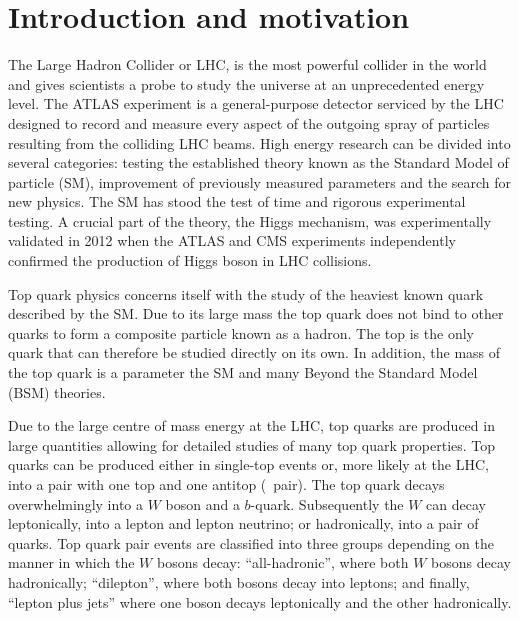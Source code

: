 \chapter{Introduction and motivation}
\label{sec:Introduction}

The Large Hadron Collider or LHC, is the most powerful collider in the world and gives scientists a probe to study the universe at an unprecedented energy level. The ATLAS experiment is a general-purpose detector serviced by the LHC designed to record and measure every aspect of the outgoing spray of particles resulting from the colliding LHC beams. High energy research can be divided into several categories: testing the established theory known as the Standard Model of particle (SM), improvement of previously measured parameters and the search for new physics. The SM has stood the test of time and rigorous experimental testing. A crucial part of the theory, the Higgs mechanism, was experimentally validated in 2012 when the ATLAS and CMS experiments independently confirmed the production of Higgs boson in LHC collisions.

Top quark physics concerns itself with the study of the heaviest known quark described by the SM. Due to its large mass the top quark does not bind to other quarks to form a composite particle known as a hadron. The top is the only quark that can therefore be studied directly on its own. In addition, the mass of the top quark is a parameter the SM and many Beyond the Standard Model (BSM) theories.

Due to the large centre of mass energy at the LHC, top quarks are produced in large quantities allowing for detailed studies of many top quark properties. Top quarks can be produced either in single-top events or, more likely at the LHC, into a pair with one top and one antitop (\ttbar\ pair). The top quark decays overwhelmingly into a $W$ boson and a $b$-quark. Subsequently the $W$ can decay leptonically, into a lepton and lepton neutrino; or hadronically, into a pair of quarks. Top quark pair events are classified into three groups depending on the manner in which the $W$ bosons decay: ``all-hadronic'', where both $W$ bosons decay hadronically; ``dilepton'', where both bosons decay into leptons; and finally, ``lepton plus jets'' where one boson decays leptonically and the other hadronically.

